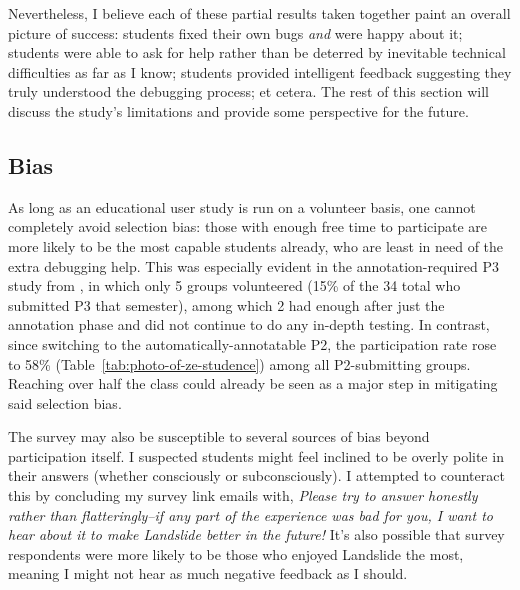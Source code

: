 Nevertheless, I believe each of these partial results taken together
paint an overall picture of success:
students fixed their own bugs {\em and} were happy about it;
students were able to ask for help rather than be deterred by inevitable technical difficulties as far as I know;
students provided intelligent feedback suggesting they truly understood the debugging process;
et cetera.
%
The rest of this section will discuss the study's limitations and provide some perspective for the future.

\subsection{Bias}


As long as an educational user study is run on a volunteer basis,
one cannot completely avoid selection bias:
those with enough free time to participate are more likely to be the most capable students already,
who are least in need of the extra debugging help.
This was especially evident in the annotation-required P3 study from  \cite{landslide},
in which only 5 groups volunteered (15\% of the 34 total who submitted P3 that semester),
among which 2 had enough after just the annotation phase and did not continue to do any in-depth testing.
In contrast, since switching to the automatically-annotatable P2,
the participation rate rose to 58\% (Table~\ref{tab:photo-of-ze-studence})
among all P2-submitting groups.
Reaching over half the class could already be seen as a major step in mitigating said selection bias.

The survey may also be susceptible to several sources of bias beyond participation itself.
I suspected students might feel inclined to be overly polite in their answers
(whether consciously or subconsciously).
I attempted to counteract this by concluding my survey link emails with,
{\em Please try to answer honestly rather than flatteringly--if any part
of the experience was bad for you, I want to hear about it to make
Landslide better in the future!}
It's also possible that survey respondents %
were more likely to be those who enjoyed Landslide the most,
meaning I might not hear as much negative feedback as I should.

